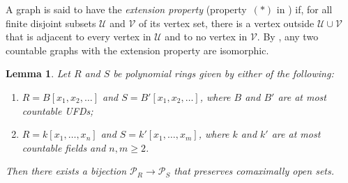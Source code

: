 \documentclass[12pt,reqno,a4paper]{amsart}
\newcommand{\Pe}{\mathcal{P}}
\theoremstyle{plain}
\newtheorem{lemma}[theorem]{Lemma}
\theoremstyle{definition}
\begin{document}
A graph is said to have the \emph{extension property} (property~$(\ast)$ in \cite[Section~8.3]{Diestel}) if, for all finite disjoint subsets $\mathcal{U}$ and $\mathcal{V}$ of its vertex set, there is a vertex outside $\mathcal{U}\cup\mathcal{V}$ that is adjacent to every vertex in $\mathcal{U}$ and to no vertex in $\mathcal{V}$. By \cite[Theorem~8.3.1]{Diestel}, any two countable graphs with the extension property are isomorphic.
\begin{lemma}\label{lem:bijection}
Let $R$ and $S$ be polynomial rings given by either of the following:
\begin{enumerate}[label=\textup{(\roman*)}]
    \item $R = B[x_1, x_2, \dots]$ and $S = B'[x_1, x_2, \dots]$, where $B$ and $B'$ are at most countable UFDs;
    \item $R = k[x_1, \dots, x_n]$ and $S = k'[x_1, \dots, x_m]$, where $k$ and $k'$ are at most countable fields and $n, m \geq 2$.
\end{enumerate}
Then there exists a bijection $\Pe_R \to \Pe_S$ that preserves comaximally open sets.
\end{lemma}
\end{document}
